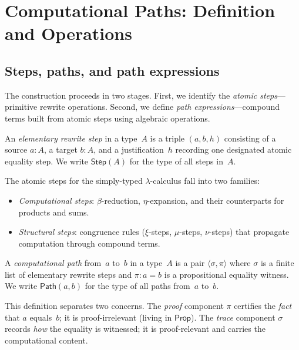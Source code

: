 \documentclass[manuscript]{BSLstyle}
\newcommand{\Path}{\mathsf{Path}}
\newcommand{\Prop}{\mathsf{Prop}}
\newcommand{\Step}{\mathsf{Step}}
\begin{document}
\section{Computational Paths: Definition and Operations}\label{sec:paths}

\subsection{Steps, paths, and path expressions}

The construction proceeds in two stages.  First, we identify the
\emph{atomic steps}---primitive rewrite operations.  Second, we define
\emph{path expressions}---compound terms built from atomic steps using
algebraic operations.

\begin{definition}\label{def:step}
An \emph{elementary rewrite step} in a type~$A$ is a triple $(a, b, h)$
consisting of a source $a : A$, a target $b : A$, and a justification~$h$
recording one designated atomic equality step.  We write $\Step(A)$ for the
type of all steps in~$A$.
\end{definition}

The atomic steps for the simply-typed $\lambda$-calculus fall into two
families:
\begin{itemize}
\item \emph{Computational steps}: $\beta$-reduction, $\eta$-expansion,
  and their counterparts for products and sums.
\item \emph{Structural steps}: congruence rules ($\xi$-steps,
  $\mu$-steps, $\nu$-steps) that propagate computation through compound
  terms.
\end{itemize}

\begin{definition}\label{def:path}
A \emph{computational path} from~$a$ to~$b$ in a type~$A$ is a pair
$\langle \sigma, \pi \rangle$ where $\sigma$ is a finite list of
elementary rewrite steps and $\pi : a = b$ is a propositional equality
witness.  We write $\Path(a, b)$ for the type of all paths from~$a$
to~$b$.
\end{definition}

This definition separates two concerns.  The \emph{proof} component
$\pi$ certifies the \emph{fact} that $a$ equals~$b$; it is
proof-irrelevant (living in $\Prop$).  The \emph{trace} component
$\sigma$ records \emph{how} the equality is witnessed; it is
proof-relevant and carries the computational content.
\end{document}
